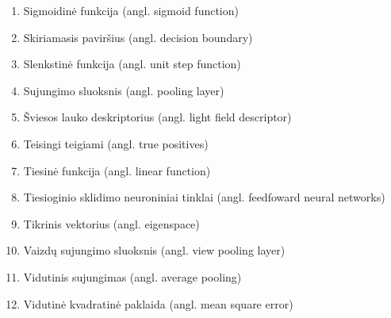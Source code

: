 \begin{enumerate}
	\item Sigmoidinė funkcija (angl. sigmoid function)
	\item Skiriamasis paviršius (angl. decision boundary)
	\item Slenkstinė funkcija (angl. unit step function)
	\item Sujungimo sluoksnis (angl. pooling layer)
	\item Šviesos lauko deskriptorius (angl. light field descriptor)
	\item Teisingi teigiami (angl. true positives)
	\item Tiesinė funkcija (angl. linear function)
	\item Tiesioginio sklidimo neuroniniai tinklai (angl. feedfoward neural networks)
	\item Tikrinis vektorius (angl. eigenspace)
	\item Vaizdų sujungimo sluoksnis (angl. view pooling layer)
	\item Vidutinis sujungimas (angl. average pooling)
	\item Vidutinė kvadratinė paklaida (angl. mean square error)
\end{enumerate}